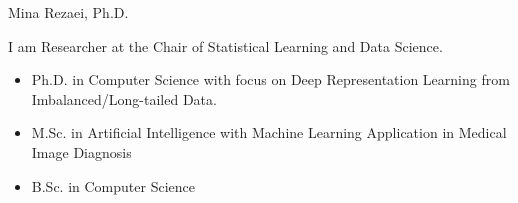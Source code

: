 \begin{frame}  {Mina Rezaei, Ph.D.}

 I am Researcher at the Chair of Statistical Learning and Data Science.
    \begin{itemize}
      \item Ph.D. in Computer Science with focus on Deep Representation Learning from Imbalanced/Long-tailed Data.
      \item M.Sc. in Artificial Intelligence with Machine Learning Application in Medical Image Diagnosis
      \item B.Sc. in Computer Science
    \end{itemize}
  \begin{figure}
    \centering

  \end{figure}
  
\end{frame}


